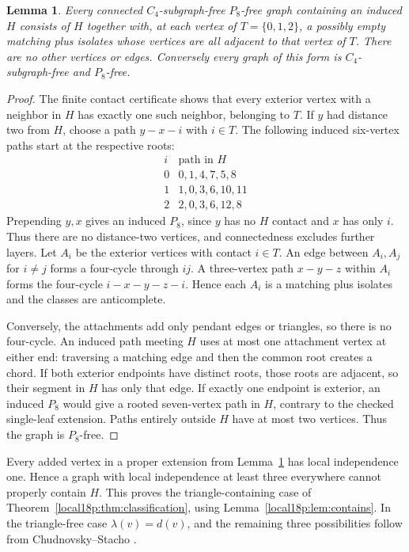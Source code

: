 \documentclass[11pt,a4paper]{article}
\newtheorem{lemma}[theorem]{Lemma}
\theoremstyle{definition}\newtheorem{definition}[theorem]{Definition}
\theoremstyle{remark}\newtheorem{remark}[theorem]{Remark}
\begin{document}
\begin{lemma}\label{local18p:lem:attachments}
Every connected $C_4$-subgraph-free $P_8$-free graph containing an induced
$H$ consists of $H$ together with, at each vertex of $T=\{0,1,2\}$,
a possibly empty matching plus isolates whose vertices are all adjacent
to that vertex of $T$. There are no other vertices or edges.
Conversely every graph of this form is $C_4$-subgraph-free and $P_8$-free.
\end{lemma}
\begin{proof}
The finite contact certificate shows that every exterior vertex with a
neighbor in $H$ has exactly one such neighbor, belonging to $T$.
If $y$ had distance two from $H$, choose a path $y-x-i$ with $i\in T$.
The following induced six-vertex paths start at the respective roots:
\[
\begin{array}{c|l}
i&\text{path in }H\\\hline
0&0,1,4,7,5,8\\
1&1,0,3,6,10,11\\
2&2,0,3,6,12,8
\end{array}
\]
Prepending $y,x$ gives an induced $P_8$, since $y$ has no $H$ contact
and $x$ has only $i$. Thus there are no distance-two vertices, and
connectedness excludes further layers.
Let $A_i$ be the exterior vertices with contact $i\in T$.
An edge between $A_i,A_j$ for $i\ne j$ forms a four-cycle through $ij$.
A three-vertex path $x-y-z$ within $A_i$ forms the four-cycle
$i-x-y-z-i$. Hence each $A_i$ is a matching plus isolates and the
classes are anticomplete.

Conversely, the attachments add only pendant edges or triangles, so
there is no four-cycle. An induced path meeting $H$ uses at most one
attachment vertex at either end: traversing a matching edge and then
the common root creates a chord. If both exterior endpoints have
distinct roots, those roots are adjacent, so their segment in $H$ has
only that edge. If exactly one endpoint is exterior, an induced $P_8$
would give a rooted seven-vertex path in $H$, contrary to the checked
single-leaf extension. Paths entirely outside $H$ have at most two
vertices. Thus the graph is $P_8$-free.
\end{proof}

Every added vertex in a proper extension from
Lemma~\ref{local18p:lem:attachments} has local independence one. Hence a graph
with local independence at least three everywhere cannot properly
contain $H$. This proves the triangle-containing case of
Theorem~\ref{local18p:thm:classification}, using Lemma~\ref{local18p:lem:contains}.
In the triangle-free case $\lambda(v)=d(v)$, and the remaining three
possibilities follow from Chudnovsky--Stacho \cite[Theorem 1]{src:cs}.
\end{document}
